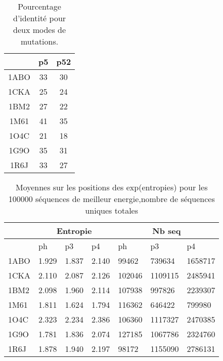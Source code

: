 \documentclass[a4paper,12pt]{article}
\begin{document}
    \begin{table}[!htbp]
      \centering
      
      \begin{tabular}{|c|c|c|}      
          \hline
          & p5 & p52 \\
          \hline
          
          1ABO & 33 & 30 \\      
          1CKA & 25 & 24 \\
          1BM2 & 27 & 22 \\
          1M61 & 41 & 35 \\
          1O4C & 21 & 18 \\
          1G9O & 35 & 31 \\
          1R6J & 33 & 27 \\ \hline
          
        \end{tabular}
        
        \caption{Pourcentage d'identité pour deux modes de mutations. }      
        \label{tab_mut}        
        \end{table}


    \begin{table}[!htbp]
      \centering
      
      \begin{tabular}{|l|l|l|l||l|l|l|}
        \hline
        \multicolumn{1}{|c|}{} &\multicolumn{3}{c||}{Entropie} & \multicolumn{3}{c||}{Nb seq} \\ \hline

        & ph & p3 & p4 & ph & p3 & p4 \\ \hline      
        1ABO & 1.929 & 1.837 & 2.140 &  99462 &  739634  & 1658717   \\ \hline      
        1CKA & 2.110 & 2.087 & 2.126 & 102046 & 1109115  & 2485941   \\ \hline      
        1BM2 & 2.098 & 1.960 & 2.114 & 107938 &  997826  & 2239307   \\ \hline      
        1M61 & 1.811 & 1.624 & 1.794 & 116362 &  646422  &  799980   \\ \hline      
        1O4C & 2.323 & 2.234 & 2.386 & 106360 & 1117327  & 2470385   \\ \hline      
        1G9O & 1.781 & 1.836 & 2.074 & 127185 & 1067786  & 2324760   \\ \hline      
        1R6J & 1.878 & 1.940 & 2.197 &  98172 & 1155090  & 2786131   \\ \hline      
        
        
        \hline
      \end{tabular}
      \caption{Moyennes sur les positions des exp(entropies) pour les 100000 séquences de meilleur energie,nombre de séquences uniques totales}      
      \label{tab_MCvsHeur}

    \end{table}
\end{document}
